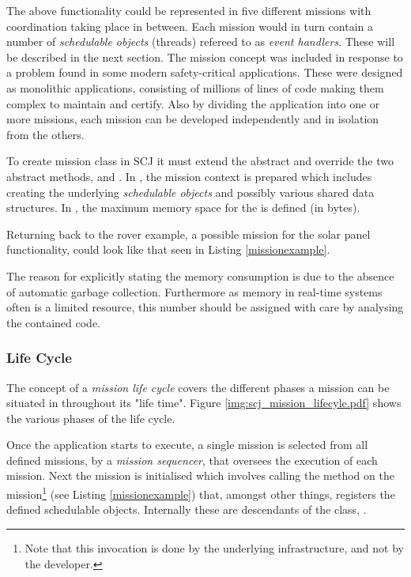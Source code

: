 The above functionality could be represented in five different missions with coordination taking place in between. Each mission would in turn contain a number of \textit{schedulable objects} (threads) refereed to as \textit{event handlers}. These will be described in the next section. The mission concept was included in response to a problem found in some modern safety-critical applications. These were designed as monolithic applications, consisting of millions of lines of code making them complex to maintain and certify. Also by dividing the application into one or more missions, each mission can be developed independently and in isolation from the others.  

To create mission class in SCJ it must extend the abstract  and override the two abstract methods,  and . In , the mission context is prepared which includes creating the underlying \textit{schedulable objects} and possibly various shared data structures. In , the maximum memory space for the  is defined (in bytes).

Returning back to the rover example, a possible mission for the solar panel functionality, could look like that seen in Listing \ref{missionexample}.



The reason for explicitly stating the memory consumption is due to the absence of automatic garbage collection. Furthermore as memory in real-time systems often is a limited resource, this number should be assigned with care by analysing the contained code.

\subsubsection{Life Cycle}
\label{subsec:lifecycle}
The concept of a \textit{mission life cycle} covers the different phases a mission can be situated in throughout its "life time". Figure \ref{img:scj_mission_lifecyle.pdf} shows the various phases of the life cycle.


Once the application starts to execute, a single mission is selected from all defined missions, by a \textit{mission sequencer}, that oversees the execution of each mission. Next the mission is initialised which involves calling the  method on the mission\footnote{Note that this invocation is done by the underlying infrastructure, and not by the developer.} (see Listing \ref{missionexample}) that, amongst other things, registers the defined schedulable objects. Internally these are descendants of the class, . 

